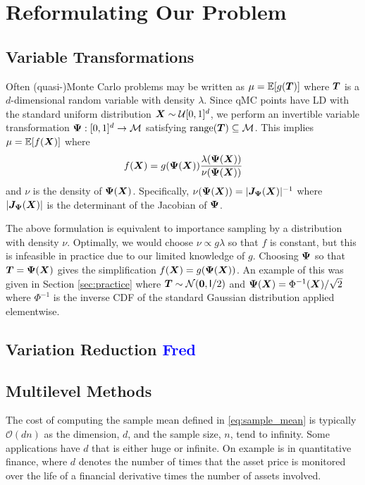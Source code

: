 \documentclass{svproc}
\begin{document}
\section{Reformulating Our Problem} \label{sec:reformulate}
\subsection{Variable Transformations} 

Often (quasi-)Monte Carlo problems may be written as $\mu = {\mathbb{E}}[g({\boldsymbol{T}})]$ where ${\boldsymbol{T}}$ is a $d$-dimensional random variable with density $\lambda$. Since qMC points have LD with the standard uniform distribution ${\boldsymbol{X}} \sim {\mathcal{U}}[0,1]^d$, we perform an invertible variable transformation ${\boldsymbol{\Psi}}: [0,1]^d \to {\mathcal{M}}$ satisfying $\mathrm{range}({\boldsymbol{T}}) \subseteq {\mathcal{M}}$. This implies
$\mu = {\mathbb{E}}[f({\boldsymbol{X}})]$ where  
$$f({\boldsymbol{X}}) = g({\boldsymbol{\Psi}}({\boldsymbol{X}})) \frac{\lambda ({\boldsymbol{\Psi}}({\boldsymbol{X}}))}{\nu({\boldsymbol{\Psi}}({\boldsymbol{X}}))}$$
and $\nu$ is the density of ${\boldsymbol{\Psi}}({\boldsymbol{X}})$. Specifically, $\nu({\boldsymbol{\Psi}}({\boldsymbol{X}}))= \lvert {\boldsymbol{J}}_{\boldsymbol{\Psi}}({\boldsymbol{X}}) \rvert^{-1}$ where $\lvert {\boldsymbol{J}}_{\boldsymbol{\Psi}}({\boldsymbol{X}}) \rvert$ is the determinant of the Jacobian of ${\boldsymbol{\Psi}}$. 

The above formulation is equivalent to importance sampling by a distribution with density $\nu$. Optimally, we would choose $\nu \propto g\lambda$ so that $f$ is constant, but this is infeasible in practice due to our limited knowledge of $g$. Choosing ${\boldsymbol{\Psi}}$ so that ${\boldsymbol{T}} = {\boldsymbol{\Psi}}({\boldsymbol{X}})$ gives the simplification $f({\boldsymbol{X}}) = g({\boldsymbol{\Psi}}({\boldsymbol{X}}))$. An example of this was given in Section \ref{sec:practice} where ${\boldsymbol{T}} \sim {\mathcal{N}}(\boldsymbol{0},\mathsf{I}/2)$ and ${\boldsymbol{\Psi}}({\boldsymbol{X}}) = \Phi^{-1}({\boldsymbol{X}})/\sqrt{2}$ where $\Phi^{-1}$ is the inverse CDF of the standard Gaussian distribution applied elementwise.

\subsection{Variation Reduction \textcolor{blue}{Fred}} 
\subsection{Multilevel Methods} \label{sec:multi}
The cost of computing the sample mean defined in \eqref{eq:sample_mean} is typically $\mathcal{O}(dn)$ as the dimension, $d$, and the sample size, $n$, tend to infinity.  Some applications have $d$ that is either huge or infinite.  On example is in quantitative finance, where $d$ denotes the number of times that the asset price is monitored over the life of a financial derivative times the number of assets involved.  
\end{document}
